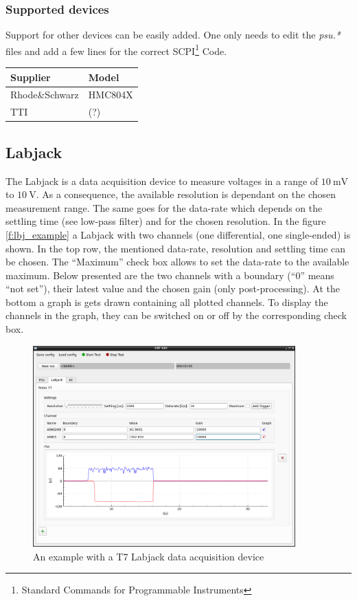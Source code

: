 \documentclass[10pt,a4paper]{article}
\begin{document}
		\subsubsection{Supported devices}
		Support for other devices can be easily added. One only needs to edit the \textit{psu.*} files and add a few lines for the correct SCPI\footnote{Standard Commands for Programmable Instruments} Code.
	
		\begin{table}[H]
		\centering
		\begin{tabular}{ll}
		\toprule
		Supplier			& Model \\ \midrule
		Rhode\&Schwarz		& HMC804X \\
		TTI					& (?) \\
		\bottomrule
		\end{tabular}			
		\end{table}	
		
\newpage
	
	\subsection{Labjack}
	The Labjack is a data acquisition device to measure voltages in a range of $\SI{10}{\milli\volt}$ to $\SI{10}{\volt}$. As a consequence, the available resolution is dependant on the chosen measurement range. The same goes for the data-rate which depends on the settling time (see low-pass filter) and for the chosen resolution. In the figure \eqref{f:lbj_example} a Labjack with two channels (one differential, one single-ended) is shown. In the top row, the mentioned data-rate, resolution and settling time can be chosen. The \enquote{Maximum} check box allows to set the data-rate to the available maximum. Below presented are the two channels with a boundary (\enquote{0} means \enquote{not set}), their latest value and the chosen gain (only post-processing). At the bottom a graph is gets drawn containing all plotted channels. To display the channels in the graph, they can be switched on or off by the corresponding check box. 
	
	\begin{figure}[H]
	\centering
	\includegraphics[width=0.9\textwidth]{./3_LBJ_example.png}
	\caption{An example with a T7 Labjack data acquisition device}
	\label{f:lbj_example}
	\end{figure}
	
\end{document}
